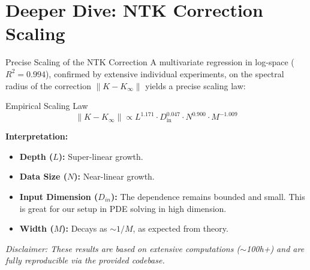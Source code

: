 \documentclass{beamer}
\begin{document}
\section{Deeper Dive: NTK Correction Scaling}

\begin{frame}{Precise Scaling of the NTK Correction}
A multivariate regression in log-space ($R^2=0.994$), confirmed by extensive individual experiments, on the spectral radius of the correction $\|K - K_\infty\|$ yields a precise scaling law:

\begin{alertblock}{Empirical Scaling Law}
\[
\|K - K_\infty\| \propto L^{1.171} \cdot D_{\text{in}}^{0.047} \cdot N^{0.900} \cdot M^{-1.009}
\]
\end{alertblock}

\textbf{Interpretation:}
\begin{itemize}
    \item \textbf{Depth ($L$):} Super-linear growth.
    \item \textbf{Data Size ($N$):} Near-linear growth.
    \item \textbf{Input Dimension ($D_{in}$):} The dependence remains bounded and small. This is great for our setup in PDE solving in high dimension.
    \item \textbf{Width ($M$):} Decays as $\sim 1/M$, as expected from theory.
\end{itemize}

\vfill
\tiny{\textit{Disclaimer: These results are based on extensive computations ($\sim$100h+) and are fully reproducible via the provided codebase.}}

\end{frame}
\end{document}
